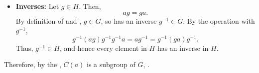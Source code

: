 \begin{enumerate}
\begin{subprove}
\begin{itemize}
      \item \textbf{Inverses:} Let $g \in H$. 
      Then, 
      \[
        a g = g a.
      \]
      By definition of  and , 
      $g \in G$, so has an inverse $g^{-1} \in G$.
      By the operation with $g^{-1}$,
      \[
        g^{-1} (a g) g^{-1} g^{-1} a=  a g^{-1} = g^{-1} (g a) g^{-1}.
      \]
      Thus, $g^{-1} \in H$, and hence every element in $H$ has an inverse in $H$.
    \end{itemize}
    Therefore, by the , $C(a)$ is a subgroup of $G$, 
    .
  \end{subprove}








\end{enumerate}
